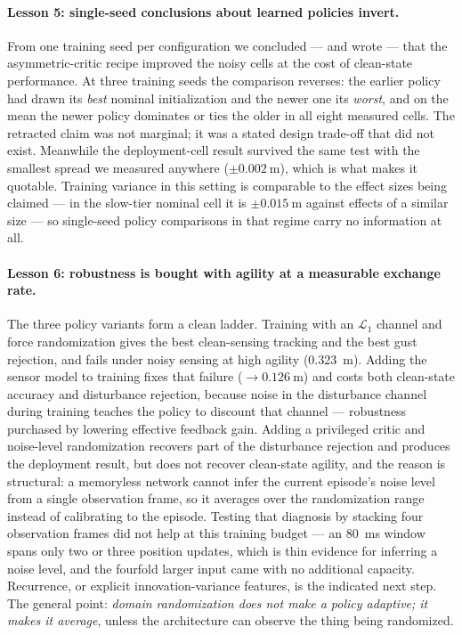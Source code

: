 \paragraph{Lesson 5: single-seed conclusions about learned policies invert.}
From one training seed per configuration we concluded --- and wrote --- that the
asymmetric-critic recipe improved the noisy cells at the cost of clean-state
performance. At three training seeds the comparison reverses: the earlier policy had
drawn its \emph{best} nominal initialization and the newer one its \emph{worst}, and on
the mean the newer policy dominates or ties the older in all eight measured cells. The
retracted claim was not marginal; it was a stated design trade-off that did not exist.
Meanwhile the deployment-cell result survived the same test with the smallest spread we
measured anywhere ($\pm\SI{0.002}{\meter}$), which is what makes it quotable. Training
variance in this setting is comparable to the effect sizes being claimed --- in the
slow-tier nominal cell it is $\pm\SI{0.015}{\meter}$ against effects of a similar size
--- so single-seed policy comparisons in that regime carry no information at all.

\paragraph{Lesson 6: robustness is bought with agility at a measurable exchange rate.}
The three policy variants form a clean ladder. Training with an $\mathcal{L}_1$ channel
and force randomization gives the best clean-sensing tracking and the best gust
rejection, and fails under noisy sensing at high agility (\SI{0.323}{\meter}). Adding
the sensor model to training fixes that failure ($\rightarrow\SI{0.126}{\meter}$) and
costs both clean-state accuracy and disturbance rejection, because noise in the
disturbance channel during training teaches the policy to discount that channel ---
robustness purchased by lowering effective feedback gain. Adding a privileged critic and
noise-level randomization recovers part of the disturbance rejection and produces the
deployment result, but does not recover clean-state agility, and the reason is
structural: a memoryless network cannot infer the current episode's noise level from a
single observation frame, so it averages over the randomization range instead of
calibrating to the episode. Testing that diagnosis by stacking four observation frames
did not help at this training budget --- an \SI{80}{\milli\second} window spans only two
or three position updates, which is thin evidence for inferring a noise level, and the
fourfold larger input came with no additional capacity. Recurrence, or explicit
innovation-variance features, is the indicated next step. The general point:
\emph{domain randomization does not make a policy adaptive; it makes it average}, unless
the architecture can observe the thing being randomized.


